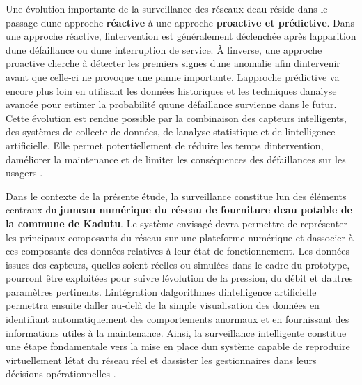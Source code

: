 \documentclass[12pt,a4paper,oneside]{report}
\begin{document}
Une évolution importante de la surveillance des réseaux
d\textquotesingle eau réside dans le passage d\textquotesingle une
approche \textbf{réactive} à une approche \textbf{proactive et
prédictive}. Dans une approche réactive, l\textquotesingle intervention
est généralement déclenchée après l\textquotesingle apparition
d\textquotesingle une défaillance ou d\textquotesingle une interruption
de service. À l\textquotesingle inverse, une approche proactive cherche
à détecter les premiers signes d\textquotesingle une anomalie afin
d\textquotesingle intervenir avant que celle-ci ne provoque une panne
importante. L\textquotesingle approche prédictive va encore plus loin en
utilisant les données historiques et les techniques
d\textquotesingle analyse avancée pour estimer la probabilité
qu\textquotesingle une défaillance survienne dans le futur. Cette
évolution est rendue possible par la combinaison des capteurs
intelligents, des systèmes de collecte de données, de
l\textquotesingle analyse statistique et de
l\textquotesingle intelligence artificielle. Elle permet potentiellement
de réduire les temps d\textquotesingle intervention,
d\textquotesingle améliorer la maintenance et de limiter les
conséquences des défaillances sur les usagers \cite{ref47}.

Dans le contexte de la présente étude, la surveillance constitue
l\textquotesingle un des éléments centraux du \textbf{jumeau numérique
du réseau de fourniture d\textquotesingle eau potable de la commune de
Kadutu}. Le système envisagé devra permettre de représenter les
principaux composants du réseau sur une plateforme numérique et
d\textquotesingle associer à ces composants des données relatives à leur
état de fonctionnement. Les données issues des capteurs,
qu\textquotesingle elles soient réelles ou simulées dans le cadre du
prototype, pourront être exploitées pour suivre
l\textquotesingle évolution de la pression, du débit et
d\textquotesingle autres paramètres pertinents.
L\textquotesingle intégration d\textquotesingle algorithmes
d\textquotesingle intelligence artificielle permettra ensuite
d\textquotesingle aller au-delà de la simple visualisation des données
en identifiant automatiquement des comportements anormaux et en
fournissant des informations utiles à la maintenance. Ainsi, la
surveillance intelligente constitue une étape fondamentale vers la mise
en place d\textquotesingle un système capable de reproduire
virtuellement l\textquotesingle état du réseau réel et
d\textquotesingle assister les gestionnaires dans leurs décisions
opérationnelles \cite{ref17}.
\end{document}

